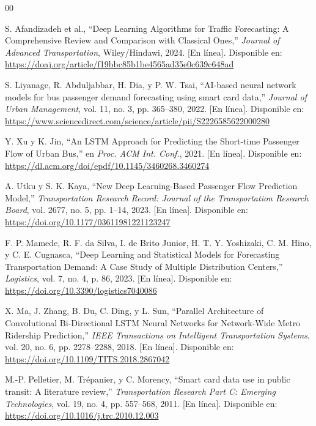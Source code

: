 \documentclass[preprint,12pt]{elsarticle}
\begin{document}
\begin{thebibliography}{00}

S. Afandizadeh et al., ``Deep Learning Algorithms for Traffic Forecasting: A Comprehensive Review and Comparison with Classical Ones,'' \textit{Journal of Advanced Transportation}, Wiley/Hindawi, 2024. [En línea]. Disponible en: \url{https://doaj.org/article/f19bbc85b1be4565ad35e0c639c648ad}

S. Liyanage, R. Abduljabbar, H. Dia, y P. W. Tsai, ``AI-based neural network models for bus passenger demand forecasting using smart card data,'' \textit{Journal of Urban Management}, vol. 11, no. 3, pp. 365--380, 2022. [En línea]. Disponible en: \url{https://www.sciencedirect.com/science/article/pii/S2226585622000280}

Y. Xu y K. Jin, ``An LSTM Approach for Predicting the Short-time Passenger Flow of Urban Bus,'' en \textit{Proc. ACM Int. Conf.}, 2021. [En línea]. Disponible en: \url{https://dl.acm.org/doi/epdf/10.1145/3460268.3460274}

A. Utku y S. K. Kaya, ``New Deep Learning-Based Passenger Flow Prediction Model,'' \textit{Transportation Research Record: Journal of the Transportation Research Board}, vol. 2677, no. 5, pp. 1--14, 2023. [En línea]. Disponible en: \url{https://doi.org/10.1177/03611981221123247}

F. P. Mamede, R. F. da Silva, I. de Brito Junior, H. T. Y. Yoshizaki, C. M. Hino, y C. E. Cugnasca, ``Deep Learning and Statistical Models for Forecasting Transportation Demand: A Case Study of Multiple Distribution Centers,'' \textit{Logistics}, vol. 7, no. 4, p. 86, 2023. [En línea]. Disponible en: \url{https://doi.org/10.3390/logistics7040086}

X. Ma, J. Zhang, B. Du, C. Ding, y L. Sun, ``Parallel Architecture of Convolutional Bi-Directional LSTM Neural Networks for Network-Wide Metro Ridership Prediction,'' \textit{IEEE Transactions on Intelligent Transportation Systems}, vol. 20, no. 6, pp. 2278--2288, 2018. [En línea]. Disponible en: \url{https://doi.org/10.1109/TITS.2018.2867042}

M.-P. Pelletier, M. Trépanier, y C. Morency, ``Smart card data use in public transit: A literature review,'' \textit{Transportation Research Part C: Emerging Technologies}, vol. 19, no. 4, pp. 557--568, 2011. [En línea]. Disponible en: \url{https://doi.org/10.1016/j.trc.2010.12.003}


\end{thebibliography}
\end{document}
